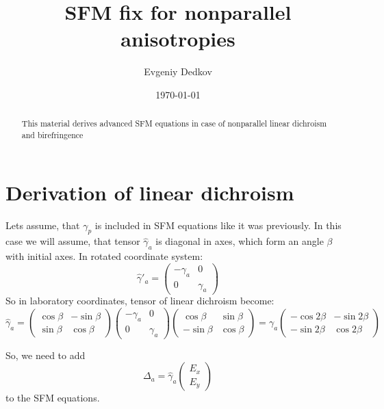 \documentclass[12pt, notitlepage]{report}
\title{SFM fix for nonparallel anisotropies}
\author{Evgeniy Dedkov}
\date{\today}
\begin{document}
		\maketitle
	\thispagestyle{empty}
	
	\begin{abstract}
		This material derives advanced SFM equations in case of nonparallel linear dichroism and birefringence
	\end{abstract}
	
	\section{Derivation of linear dichroism}
	Lets assume, that $\gamma_p$ is included in SFM equations like it was previously. In this case we will assume, that tensor $\hat{\gamma}_a$ is diagonal in axes, which form an angle $\beta$ with initial axes. In rotated coordinate system:
	\begin{equation}
		\hat{\gamma}'_a = \begin{pmatrix}
			-\gamma_a & 0\\
			0 & \gamma_a
			\end{pmatrix}
	\end{equation}
	So in laboratory coordinates, tensor of linear dichroism become:
	\begin{equation}
		\hat{\gamma}_a =\begin{pmatrix}
			\cos \beta & -\sin \beta \\
			\sin \beta & \cos \beta
		\end{pmatrix} \begin{pmatrix}
			-\gamma_a & 0\\
			0 & \gamma_a
		\end{pmatrix} \begin{pmatrix}
			\cos \beta & \sin \beta \\
			-\sin \beta & \cos \beta
		\end{pmatrix} = \gamma_a \begin{pmatrix}
			-\cos 2\beta & -\sin 2\beta \\
			-\sin 2\beta & \cos 2\beta
		\end{pmatrix}
	\end{equation}

So, we need to add 
\begin{equation}
	\Delta_a = \hat{\gamma}_a\begin{pmatrix}
		E_x \\
		E_y
	\end{pmatrix}
\end{equation}
to the SFM equations.
\end{document}
